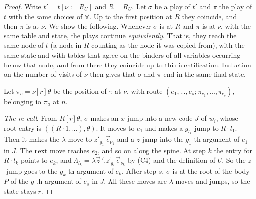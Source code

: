 \documentclass[11pt]{article}
\newcommand{\suc}[2]{#1{\cdot}#2}
\theoremstyle{plain}
\theoremstyle{definition}
\theoremstyle{remark}
\begin{document}
\begin{proof}
Write $t'=t[\nu:=R_U]$ and $R=R_U$.  Let $\sigma$ be a play of $t'$ and
$\pi$ the play of $t$ with the same choices of $\forall$.  Up to the
first position at $R$ they coincide, and then $\pi$ is at $\nu$.  We
show the following.  Whenever $\sigma$ is at $R$ and $\pi$ is at $\nu$,
with the same table and state, the plays continue \emph{equivalently}.
That is, they reach the same node of $t$ (a node in $R$ counting as the
node it was copied from), with the same state and with tables that
agree on the binders of all variables occurring below that node, and
from there they coincide up to this identification.  Induction on the
number of visits of $\nu$ then gives that $\sigma$ and $\pi$ end in the
same final state.

Let $\pi_c=\nu[r]\theta$ be the position of $\pi$ at $\nu$, with route
$(e_1,\dots,e_s;\pi_{c_1},\dots,\pi_{c_s})$, belonging to $\pi_a$ at $n$.

\emph{The re-call.}  From $R[r]\theta$, $\sigma$ makes an $x$-jump into a
new code $J$ of $w_i$, whose root entry is $((\suc R1,\dots),\theta)$.  It
moves to $e_1$ and makes a $y_{l_1}$-jump to $\suc R{l_1}$.  Then it makes
the $\lambda$-move to $z'_{g_1}\,\vec e_{\nu_1}$ and a $z$-jump into the
$g_1$-th argument of $e_1$ in $J$.  The next move reaches $e_2$, and so
on along the spine.  At step $k$ the entry for $\suc R{l_k}$ points to
$e_k$, and $\Lambda_{l_k}=\lambda\vec z\,'.z'_{g_k}\vec e_{\nu_k}$ by (C4)
and the definition of $U$.  So the $z$-jump goes to the $g_k$-th
argument of $e_k$.  After step $s$, $\sigma$ is at the root of the body
$P$ of the $g$-th argument of $e_s$ in $J$.  All these moves are
$\lambda$-moves and jumps, so the state stays $r$.


\end{proof}
\end{document}
